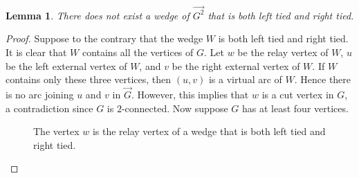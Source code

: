 \documentclass[12pt,letterpaper,oneside]{book}
\newtheorem{lemma}[theorem]{Lemma}
\begin{document}
\begin{lemma}\label{lemboth}
There does not exist a wedge of $\vec{G^2}$ that is both left tied and right tied.
\end{lemma}
\begin{proof}
Suppose to the contrary that the wedge $W$ is both left tied and right tied.  It is 
clear that $W$ contains all the vertices of $G$.  
Let $w$ be the relay vertex of $W$, $u$ be the left external vertex of $W$, and $v$ be the right external vertex of $W$.  
If $W$ contains only 
these three vertices, then $(u,v)$ is a virtual arc of $W$.  Hence there is no arc joining $u$ and $v$ 
in $\vec{G}$.  However, this implies that $w$ is a cut vertex in $G$, a 
contradiction since $G$ is $2$-connected.  Now suppose $G$ has at least four vertices.

\begin{figure}[htp] 
\centering 
{} 
\caption[Why a wedge cannot be both left and right tied]{The vertex $w$ is the relay vertex of a wedge that is both left tied and right tied.
\label{fig:bt}} 
\end{figure} 


\end{proof}
\end{document}
